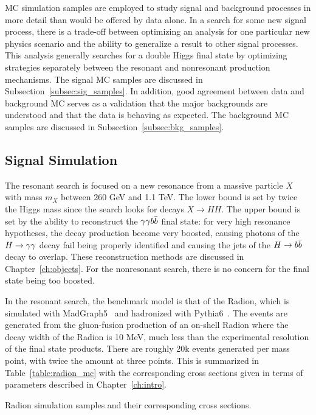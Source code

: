 
MC simulation samples are employed to study signal and background processes in more detail
than would be offered by data alone. In a search for some new signal process, there is a trade-off
between optimizing an analysis for one particular new physics scenario and the ability to
generalize a result to other signal processes. This analysis generally searches for a double Higgs final
state by optimizing strategies separately between the resonant and nonresonant production mechanisms.
The signal MC samples are discussed in Subsection~\ref{subsec:sig_samples}.
In addition, good agreement between data
and background MC serves as a validation that the major backgrounds are understood and that
the data is behaving as expected. The background MC samples are discussed in
Subsection~\ref{subsec:bkg_samples}.

\subsection{Signal Simulation\label{subsec:sig_samples}}

The resonant search is focused on a new resonance from a massive particle $X$ with mass $m_X$ between
260 GeV and 1.1 TeV. The lower bound is set by twice the Higgs mass since the search looks for decays
$X\rightarrow HH$. The upper bound is set by the ability to reconstruct the $\gamma\gamma b\bar{b}$ final state: for
very high resonance hypotheses, the decay production become very boosted, causing photons of the
$H\to\gamma\gamma$ decay fail being properly identified and causing the jets of the $H\to b\bar{b}$ decay to overlap.
These reconstruction methods are discussed in Chapter~\ref{ch:objects}. For the nonresonant
search, there is no concern for the final state being too boosted.

In the resonant search, the benchmark model is that of the Radion, which is simulated with
MadGraph5~\cite{Madgraph_Alwall:2011uj} and hadronized with Pythia6~\cite{Pythia6-0}. The events are
generated from the gluon-fusion production of an on-shell Radion where the decay width of the Radion
is 10 MeV, much less than the experimental resolution of the final state products. There are roughly
20k events generated per mass point, with twice the amount at three points.
This is summarized in Table~\ref{table:radion_mc} with the corresponding cross sections given in terms
of parameters described in Chapter~\ref{ch:intro}.

\begin{table}[ht]
  \centering
  \renewcommand{\arraystretch}{1.4}
  \caption{Radion simulation samples and their corresponding cross sections.}
  
  \label{table:radion_mc}
\end{table}

